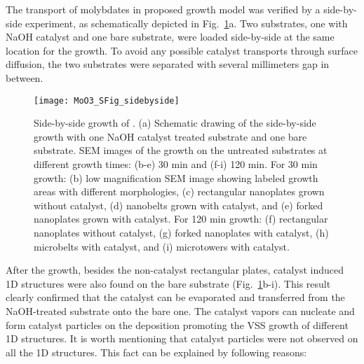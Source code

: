 The transport of molybdates in proposed growth model was verified by a side-by-side experiment, as schematically depicted in Fig.~\ref{fig:ch4sbs}a. Two substrates, one with NaOH catalyst and one bare substrate, were loaded side-by-side at the same location for the growth. To avoid any possible catalyst transports through surface diffusion, the two substrates were separated with several millimeters gap in between. 
\begin{figure}[htb]
\centering
\texttt{[image: MoO3\_SFig\_sidebyside]}
\caption[Side-by-side growth of ]{Side-by-side growth of . (a) Schematic drawing of the side-by-side growth with one NaOH catalyst treated substrate and one bare substrate. SEM images of the growth on the untreated substrates at different growth times: (b-e) 30 min and (f-i) 120 min. For 30 min growth: (b) low magnification SEM image showing labeled growth areas with different morphologies, (c) rectangular nanoplates grown without catalyst, (d) nanobelts grown with catalyst, and (e) forked nanoplates grown with catalyst. For 120 min growth: (f) rectangular nanoplates without catalyst, (g) forked nanoplates with catalyst, (h) microbelts with catalyst, and (i) microtowers with catalyst.}
\label{fig:ch4sbs}
\end{figure}
After the growth, besides the non-catalyst rectangular plates, catalyst induced 1D  structures were also found on the bare substrate (Fig.~\ref{fig:ch4sbs}b-i). This result clearly confirmed that the catalyst can be evaporated and transferred from the NaOH-treated substrate onto the bare one. The catalyst vapors can nucleate and form catalyst particles on the  deposition promoting the VSS growth of different 1D structures. It is worth mentioning that catalyst particles were not observed on all the 1D structures. This fact can be explained by following reasons:
